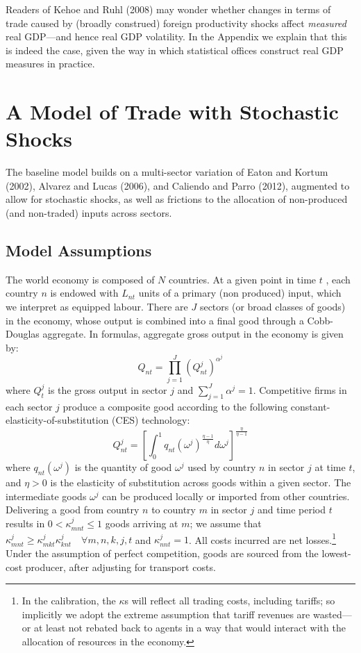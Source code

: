 \documentclass[12pt]{article}
\begin{document}
Readers of Kehoe and Ruhl (2008) may wonder whether changes in terms of
trade caused by (broadly construed) foreign productivity shocks affect 
\textit{measured} real GDP---and hence real GDP volatility. In the Appendix
we explain that this is indeed the case, given the way in which statistical
offices construct real GDP measures in practice.

\section{A Model of Trade with Stochastic Shocks}

The baseline model builds on a multi-sector variation of Eaton and Kortum
(2002), Alvarez and Lucas (2006), and Caliendo and Parro (2012), augmented
to allow for stochastic shocks, as well as frictions to the allocation of
non-produced (and non-traded) inputs across sectors.

\subsection{Model Assumptions}

The world economy is composed of $N$ countries. At a given point in time $t$%
, each country $n$ is endowed with $L_{nt}$ units of a primary (non
produced) input, which we interpret as equipped labour. There are $J$
sectors (or broad classes of goods) in the economy, whose output is combined
into a final good through a Cobb-Douglas aggregate. In formulas, aggregate
gross output in the economy is given by: 
\begin{equation}
Q_{nt}=\prod_{j=1}^{J}\left( Q_{nt}^{j}\right) ^{\alpha ^{j}}
\label{aggregate}
\end{equation}%
where $Q_{t}^{j}$ is the gross output in sector $j$ and $\sum_{j=1}^{J}%
\alpha ^{j}=1$. Competitive firms in each sector $j$ produce a composite
good according to the following constant-elasticity-of-substitution (CES)
technology: 
\begin{equation}
Q_{nt}^{j}=\left[ \int_{0}^{1}q_{nt}(\omega ^{j})^{\frac{\eta -1}{\eta }%
}d\omega ^{j}\right] ^{\frac{\eta }{\eta -1}}  \label{sectoroutput}
\end{equation}%
where $q_{nt}(\omega ^{j})$ is the quantity of good $\omega ^{j}$ used by
country $n$ in sector $j$ at time $t$, and $\eta >0$ is the elasticity of
substitution across goods within a given sector. The intermediate goods $%
\omega ^{j}$ can be produced locally or imported from other countries.
Delivering a good from country $n$ to country $m$ in sector $j$ and time
period $t$ results in $0<\kappa _{mnt}^{j}\leq 1$ goods arriving at $m$; we
assume that $\kappa _{mnt}^{j}\geq \kappa _{mkt}^{j}\kappa _{knt}^{j}\quad
\forall m,n,k,j,t$ and $\kappa _{nnt}^{j}=1$. All costs incurred are net
losses.\footnote{%
In the calibration, the $\kappa $s will reflect all trading costs, including
tariffs; so implicitly we adopt the extreme assumption that tariff revenues
are wasted---or at least not rebated back to agents in a way that would
interact with the allocation of resources in the economy.} Under the
assumption of perfect competition, goods are sourced from the lowest-cost
producer, after adjusting for transport costs. 
\end{document}
